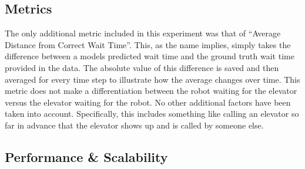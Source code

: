 \begin{center}
\subsection{ Metrics }

The only additional metric included in this experiment was that of ``Average
Distance from Correct Wait Time''. This, as the name implies, simply takes the
difference between a models predicted wait time and the ground truth wait time
provided in the data. The absolute value of this difference is saved and then
averaged for every time step to illustrate how the average changes over time. This
metric does not make a differentiation between the robot waiting for the
elevator versus the elevator waiting for the robot. No other additional
factors have been taken into account. Specifically, this includes something like calling an
elevator so far in advance that the elevator shows up and is called by someone else. \\

\subsection{ Performance \& Scalability }

\begin{table}[h!]
  \centering
  \caption{Elevator Wait Time Overview}
  \label{table:Elevator_Wait_Time_Overview}
\end{table}



\end{center}
